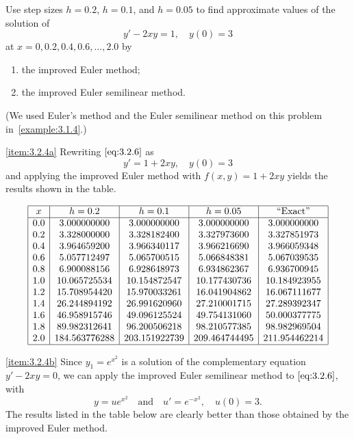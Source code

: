 \documentclass{ximera}
\begin{document}
\begin{example}\label{example:3.2.4}
Use step sizes $h=0.2$, $h=0.1$, and $h=0.05$ to find approximate
values of the solution of
\begin{equation} \label{eq:3.2.6}
y'-2xy=1,\quad y(0)=3
\end{equation}
at $x=0, 0.2, 0.4, 0.6, \dots, 2.0$ by
\begin{enumerate}
\item\label{item:3.2.4a}
the improved Euler method;
\item\label{item:3.2.4b}
the improved Euler
semilinear method. 
\end{enumerate}
(We used Euler's method and the Euler semilinear
method on this problem in~\ref{example:3.1.4}.)

\begin{explanation}
\ref{item:3.2.4a}
Rewriting $\eqref{eq:3.2.6}$ as
$$
y'=1+2xy,\quad y(0)=3
$$
and applying the improved Euler method with $f(x,y)=1+2xy$ yields
the results shown in the table.

$$
\begin{array}{|c|c|c|c|c|}
\hline
x&
h=0.2&
h=0.1&
h=0.05&
\text{``Exact''}\\ \hline
0.0 &   3.000000000 &   3.000000000 &   3.000000000 &   3.000000000 \\
0.2 &   3.328000000 &   3.328182400 &   3.327973600 &   3.327851973 \\
0.4 &   3.964659200 &   3.966340117 &   3.966216690 &   3.966059348 \\
0.6 &   5.057712497 &   5.065700515 &   5.066848381 &   5.067039535 \\
0.8 &   6.900088156 &   6.928648973 &   6.934862367 &   6.936700945 \\
1.0 &  10.065725534 &  10.154872547 &  10.177430736 &  10.184923955 \\
1.2 &  15.708954420 &  15.970033261 &  16.041904862 &  16.067111677 \\
1.4 &  26.244894192 &  26.991620960 &  27.210001715 &  27.289392347 \\
1.6 &  46.958915746 &  49.096125524 &  49.754131060 &  50.000377775 \\
1.8 &  89.982312641 &  96.200506218 &  98.210577385 &  98.982969504 \\
2.0 & 184.563776288 & 203.151922739 & 209.464744495 & 211.954462214 \\
\hline
\end{array}
$$

\ref{item:3.2.4b}
Since $y_1=e^{x^2}$ is a solution of the complementary equation
$y'-2xy=0$, we can  apply the improved Euler semilinear method to
$\eqref{eq:3.2.6}$, with
$$
y=ue^{x^2}\quad\mbox{and}\quad
u'=e^{-x^2},\quad u(0)=3.
$$
The results listed in the table below are clearly better than
those obtained by the improved Euler method.



\end{explanation}
\end{example}
\end{document}
